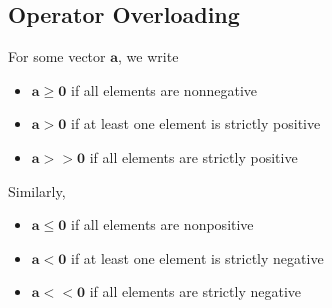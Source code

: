 \documentclass[11pt]{article}
\begin{document}
\subsection{Operator Overloading}
For some vector $\boldsymbol{a}$, we write
\begin{itemize}
    \item $\boldsymbol{a} \ge \boldsymbol{0}$ if all elements are nonnegative
    \item $\boldsymbol{a} > \boldsymbol{0}$ if at least one element is strictly positive
    \item $\boldsymbol{a} >> \boldsymbol{0}$ if all elements are strictly positive
\end{itemize}
Similarly,
\begin{itemize}
    \item $\boldsymbol{a} \le \boldsymbol{0}$ if all elements are nonpositive
    \item $\boldsymbol{a} < \boldsymbol{0}$ if at least one element is strictly negative
    \item $\boldsymbol{a} << \boldsymbol{0}$ if all elements are strictly negative
\end{itemize}
\end{document}
